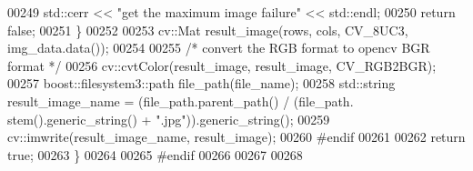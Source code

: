 \begin{DoxyCode}
00249                 std::cerr << \textcolor{stringliteral}{"get the maximum image failure"} << std::endl;
00250                 \textcolor{keywordflow}{return} \textcolor{keyword}{false};
00251         \}
00252 
00253         cv::Mat result\_image(rows, cols, CV\_8UC3, img\_data.data());
00254 
00255         \textcolor{comment}{/* convert the RGB format to opencv BGR format */}
00256         cv::cvtColor(result\_image, result\_image, CV\_RGB2BGR);
00257         boost::filesystem3::path file\_path(file\_name);
00258         std::string result\_image\_name = (file\_path.parent\_path() / (file\_path.
      stem().generic\_string() + \textcolor{stringliteral}{".jpg"})).generic\_string();
00259         cv::imwrite(result\_image\_name, result\_image);
00260 \textcolor{preprocessor}{#endif}
00261 \textcolor{preprocessor}{}
00262         \textcolor{keywordflow}{return} \textcolor{keyword}{true};
00263 \}
00264 
00265 \textcolor{preprocessor}{#endif}
00266 \textcolor{preprocessor}{}
00267 
00268 
\end{DoxyCode}
